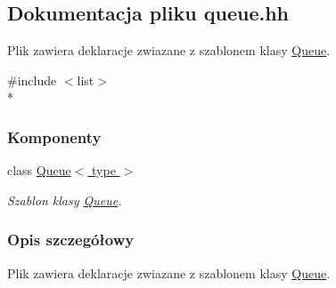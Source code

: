 \hypertarget{queue_8hh}{\subsection{Dokumentacja pliku queue.\-hh}
\label{queue_8hh}
}


Plik zawiera deklaracje zwiazane z szablonem klasy \hyperlink{class_queue}{Queue}.  


{\ttfamily \#include $<$list$>$}\\*
\subsubsection*{Komponenty}
\begin{DoxyCompactItemize}
\item 
class \hyperlink{class_queue}{Queue$<$ type $>$}
\begin{DoxyCompactList}\small\item\em Szablon klasy \hyperlink{class_queue}{Queue}. \end{DoxyCompactList}\end{DoxyCompactItemize}


\subsubsection{Opis szczegółowy}
Plik zawiera deklaracje zwiazane z szablonem klasy \hyperlink{class_queue}{Queue}. 